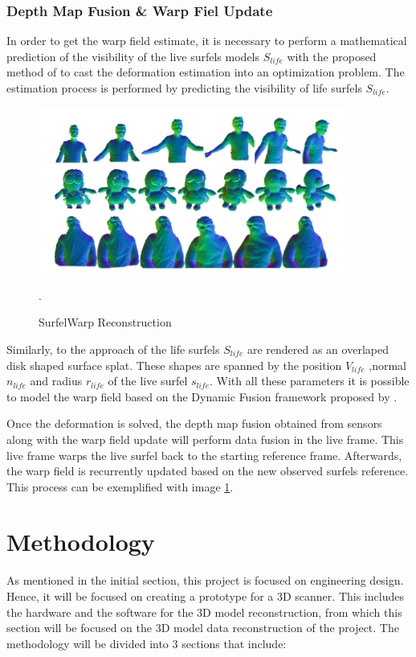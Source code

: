 \documentclass[12pt]{report}
\begin{document}
\subsection{Depth Map Fusion \& Warp Fiel Update}
In order to get the warp field estimate, it is necessary to perform a mathematical prediction of the visibility of the live surfels models $S_{life}$ with the proposed method of 
to cast the deformation estimation into an optimization problem.
The estimation process is performed by predicting the visibility of life surfels $S_{life}$.
\begin{figure}[ht]%
  \centering
  \includegraphics[width=0.9\textwidth]{surfelwarp2.png}
  \caption{SurfelWarp Reconstruction}\cite[]{SurfelWarp}.
  \label{fig:surfelprocess}
\end{figure}

Similarly, to the approach of \citet{keller} the life surfels $S_{life}$  are rendered as an overlaped disk shaped surface splat. These shapes are spanned by the position $V_{life}$ 
,normal $n_{life}$ and radius $r_{life}$ of the live surfel $s_{life}$.
With all these parameters it is possible to model the warp field based on the Dynamic Fusion framework proposed by \citet*{newcombe_fox_seitz_2015}.

Once the deformation is solved, the depth map fusion obtained from sensors along with the warp field update will perform data fusion in the live frame. 
This live frame warps the live surfel back to the starting reference frame. Afterwards, the warp field is recurrently updated based on the new observed surfels reference. This process can be exemplified with image \ref{fig:surfelprocess}.

\chapter{Methodology}
As mentioned in the initial section, this project is focused on engineering design. Hence, it will be focused on creating a prototype for a 3D scanner. 
This includes the hardware and the software for the 3D model reconstruction, from which this section will be focused on the 3D model data reconstruction of the project.
The methodology will be divided into 3 sections that include: 
\end{document}
